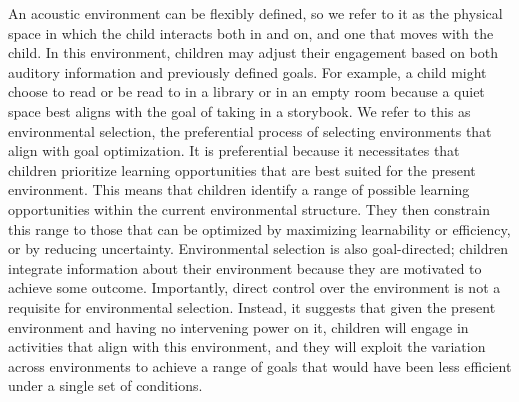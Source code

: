 \documentclass[10pt, letterpaper]{article}
\begin{document}
An acoustic environment can be flexibly defined, so we refer to it as
the physical space in which the child interacts both in and on, and one
that moves with the child. In this environment, children may adjust
their engagement based on both auditory information and previously
defined goals. For example, a child might choose to read or be read to
in a library or in an empty room because a quiet space best aligns with
the goal of taking in a storybook. We refer to this as environmental
selection, the preferential process of selecting environments that align
with goal optimization. It is preferential because it necessitates that
children prioritize learning opportunities that are best suited for the
present environment. This means that children identify a range of
possible learning opportunities within the current environmental
structure. They then constrain this range to those that can be optimized
by maximizing learnability or efficiency, or by reducing uncertainty.
Environmental selection is also goal-directed; children integrate
information about their environment because they are motivated to
achieve some outcome. Importantly, direct control over the environment
is not a requisite for environmental selection. Instead, it suggests
that given the present environment and having no intervening power on
it, children will engage in activities that align with this environment,
and they will exploit the variation across environments to achieve a
range of goals that would have been less efficient under a single set of
conditions.
\end{document}
